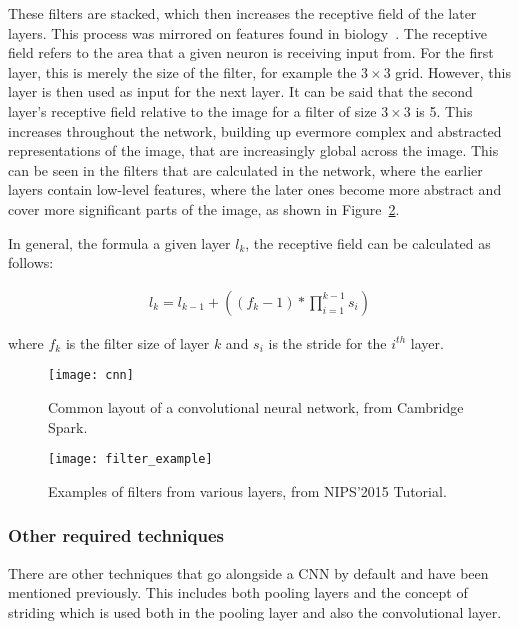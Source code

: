 These filters are stacked, which then increases the receptive field of the later
layers. This process was mirrored on features found in
biology~\cite{hubel1968receptive}. The receptive field refers to the area that a
given neuron is receiving input from. For the first layer, this is merely the
size of the filter, for example the $3 \times 3$ grid. However, this layer is
then used as input for the next layer. It can be said that the second layer's
receptive field relative to the image for a filter of size $3 \times 3$ is
5. This increases throughout the network, building up evermore complex and
abstracted representations of the image, that are increasingly global across the
image. This can be seen in the filters that are calculated in the network,
where the earlier layers contain low-level features, where the later
ones become more abstract and cover more significant parts of the image,
as shown in Figure~\ref{fig:filter_example}.

In general, the formula a given layer $l_k$, the receptive field can be
calculated as follows:

\begin{align}
    l_k = l_{k-1} + ((f_k - 1) * \prod_{i=1}^{k-1}s_i)
\end{align}

where $f_k$ is the filter size of layer $k$ and $s_i$ is the stride for the
$i^{th}$ layer.


\begin{figure}
    \centering
    \texttt{[image: cnn]}
    \caption{Common layout of a convolutional neural network, from
    Cambridge Spark\cite{cnn-layout}.}%
    \label{fig:cnn}
\end{figure}

\begin{figure}
    \centering
    \texttt{[image: filter\_example]}
    \caption{Examples of filters from various layers, from
    NIPS'2015 Tutorial\cite{filterexample}.}%
    \label{fig:filter_example}
\end{figure}

\subsubsection{Other required techniques}

There are other techniques that go alongside a CNN by default and have been
mentioned previously. This includes both pooling layers and the concept of
striding which is used both in the pooling layer and also the convolutional
layer.

